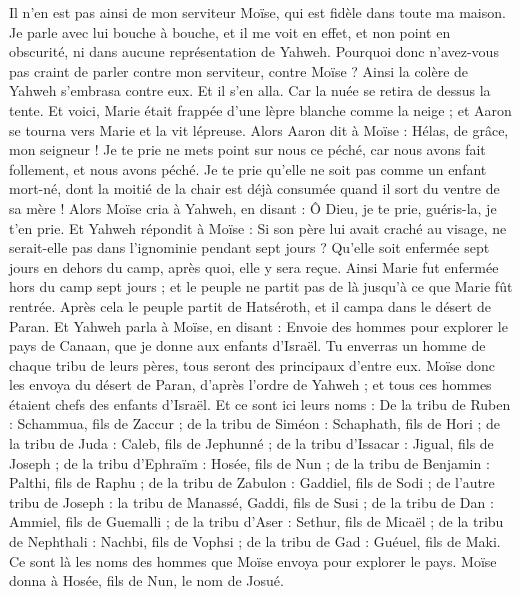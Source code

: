 \begin{multicols}{2}
Il n'en est pas ainsi de mon serviteur Moïse, qui est fidèle dans toute ma maison.
Je parle avec lui bouche à bouche, et il me voit en effet, et non point en obscurité, ni dans aucune représentation de Yahweh. Pourquoi donc n'avez-vous pas craint de parler contre mon serviteur, contre Moïse ?
Ainsi la colère de Yahweh s'embrasa contre eux. Et il s'en alla.
Car la nuée se retira de dessus la tente. Et voici, Marie était frappée d'une lèpre blanche comme la neige ; et Aaron se tourna vers Marie et la vit lépreuse.
Alors Aaron dit à Moïse : Hélas, de grâce, mon seigneur ! Je te prie ne mets point sur nous ce péché, car nous avons fait follement, et nous avons péché.
Je te prie qu'elle ne soit pas comme un enfant mort-né, dont la moitié de la chair est déjà consumée quand il sort du ventre de sa mère !
Alors Moïse cria à Yahweh, en disant : Ô Dieu, je te prie, guéris-la, je t'en prie.
Et Yahweh répondit à Moïse : Si son père lui avait craché au visage, ne serait-elle pas dans l'ignominie pendant sept jours ? Qu'elle soit enfermée sept jours en dehors du camp, après quoi, elle y sera reçue.
Ainsi Marie fut enfermée hors du camp sept jours ; et le peuple ne partit pas de là jusqu'à ce que Marie fût rentrée.
Après cela le peuple partit de Hatséroth, et il campa dans le désert de Paran.
\VerseOne{}Et Yahweh parla à Moïse, en disant :
Envoie des hommes pour explorer le pays de Canaan, que je donne aux enfants d'Israël. Tu enverras un homme de chaque tribu de leurs pères, tous seront des principaux d'entre eux.
Moïse donc les envoya du désert de Paran, d'après l'ordre de Yahweh ; et tous ces hommes étaient chefs des enfants d'Israël.
Et ce sont ici leurs noms : De la tribu de Ruben : Schammua, fils de Zaccur ;
de la tribu de Siméon : Schaphath, fils de Hori ;
de la tribu de Juda : Caleb, fils de Jephunné ;
de la tribu d'Issacar : Jigual, fils de Joseph ;
de la tribu d'Ephraïm : Hosée, fils de Nun ;
de la tribu de Benjamin : Palthi, fils de Raphu ;
de la tribu de Zabulon : Gaddiel, fils de Sodi ;
de l'autre tribu de Joseph : la tribu de Manassé, Gaddi, fils de Susi ;
de la tribu de Dan : Ammiel, fils de Guemalli ;
de la tribu d'Aser : Sethur, fils de Micaël ;
de la tribu de Nephthali : Nachbi, fils de Vophsi ;
de la tribu de Gad : Guéuel, fils de Maki.
Ce sont là les noms des hommes que Moïse envoya pour explorer le pays. Moïse donna à Hosée, fils de Nun, le nom de Josué.

\end{multicols}

